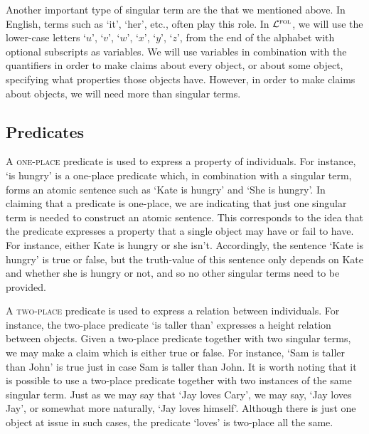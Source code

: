 Another important type of singular term are the  that we mentioned above.
In English, terms such as `it', `her', etc., often play this role.
In $\mathcal{L}^{\textsc{fol}}$, we will use the lower-case letters `$u$', `$v$', `$w$', `$x$', `$y$', `$z$', from the end of the alphabet with optional subscripts as variables.
We will use variables in combination with the quantifiers in order to make claims about every object, or about some object, specifying what properties those objects have.
However, in order to make claims about objects, we will need more than singular terms.





\subsection{Predicates}

A \textsc{one-place} predicate is used to express a property of individuals.
For instance, `is hungry' is a one-place predicate which, in combination with a singular term, forms an atomic sentence such as `Kate is hungry' and `She is hungry'.
In claiming that a predicate is one-place, we are indicating that just one singular term is needed to construct an atomic sentence.
This corresponds to the idea that the predicate expresses a property that a single object may have or fail to have.
For instance, either Kate is hungry or she isn't.
Accordingly, the sentence `Kate is hungry' is true or false, but the truth-value of this sentence only depends on Kate and whether she is hungry or not, and so no other singular terms need to be provided.

A \textsc{two-place} predicate is used to express a relation between individuals.
For instance, the two-place predicate `is taller than' expresses a height relation between objects.
Given a two-place predicate together with two singular terms, we may make a claim which is either true or false.
For instance, `Sam is taller than John' is true just in case Sam is taller than John.
It is worth noting that it is possible to use a two-place predicate together with two instances of the same singular term.
Just as we may say that `Jay loves Cary', we may say, `Jay loves Jay', or somewhat more naturally, `Jay loves himself'.
Although there is just one object at issue in such cases, the predicate `loves' is two-place all the same. 

